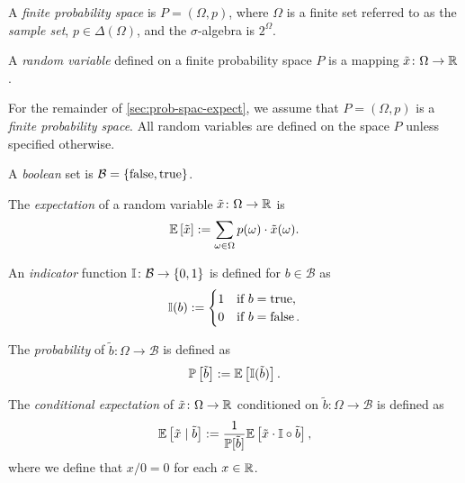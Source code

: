 \begin{definition} \label{def:probability-space}
A \emph{finite probability space} is $P = (\Omega, p)$, where $\Omega$ is a finite set referred to as the \emph{sample set}, $p\in \Delta(\Omega)$, and the $\sigma$-algebra is $2^{\Omega}$.
\end{definition}

\begin{definition}
A \emph{random variable} defined on a finite probability space $P$ is a mapping $\tilde{x}\colon \Omega \to \mathbb{R}$.
\end{definition}

For the remainder of \cref{sec:prob-spac-expect}, we assume that $P = (\Omega, p)$ is a \emph{finite probability space}. All random variables are defined on the space $P$ unless specified otherwise.

\begin{definition}
A \emph{boolean} set is $\mathcal{B} = \left\{ \operatorname{false}, \operatorname{true} \right\}$.
\end{definition}

\begin{definition} \label{def:expect}
The \emph{expectation} of a random variable $\tilde{x} \colon \Omega \to \mathbb{R}$ is 
\[
\mathbb{E} \left[ \tilde{x} \right] := \sum_{\omega \in \Omega } p(\omega ) \cdot \tilde{x}(\omega).
\]
\end{definition}

\begin{definition} \label{def:indicator}
An \emph{indicator} function $\mathbb{I} \colon \mathcal{B} \to \left\{ 0, 1 \right\}$ is defined for $b\in \mathcal{B}$ as
\[
\mathbb{I}(b) :=
\begin{cases}
1 &\text{if } b = \operatorname{true}, \\
0 &\text{if } b = \operatorname{false}.
\end{cases}
\]
\end{definition}

\begin{definition} \label{def:probability}
The \emph{probability} of $\tilde{b}\colon \Omega \to \mathcal{B}$ is defined as
\[
\mathbb{P}\left[ \tilde{b} \right] := \mathbb{E}\left[\mathbb{I}(\tilde{b})\right].
\]
\end{definition}

\begin{definition} \label{def:expect-cnd}
The \emph{conditional expectation} of $\tilde{x} \colon \Omega \to \mathbb{R}$ conditioned on $\tilde{b} \colon \Omega \to \mathcal{B}$ is defined as
\[
\mathbb{E} \left[ \tilde{x} \mid  \tilde{b} \right] :=
\frac{1}{\mathbb{P}[\tilde{b}]} \mathbb{E} \left[  \tilde{x} \cdot \mathbb{I} \circ \tilde{b} \right],
\]
where we define that $x / 0 = 0$ for each $x\in \mathbb{R}$.
\end{definition}

